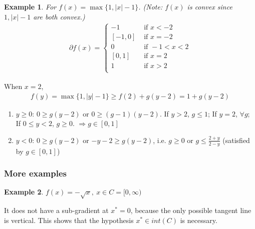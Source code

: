 \documentclass[11pt,a4paper]{article}
\newtheorem{example}{Example}
\begin{document}
\begin{example}
For $f(x)=\max\{1,|x|-1\}$. (Note: $f(x)$ is convex since $1,|x|-1$ are both convex.)
\begin{equation}
    \begin{aligned}
        \partial f(x)=\left\{\begin{matrix}
            -1&\text{ if }x<-2\\
            [-1,0]&\text{ if }x=-2\\
            0&\text{ if }-1<x<2\\
            [0,1]&\text{ if }x=2\\
            1&\text{ if }x>2\\
        \end{matrix}\right.
    \end{aligned}
    \nonumber
\end{equation}
\end{example}
When $x=2$,
\begin{equation}
    \begin{aligned}
        f(y)=\max\{1,|y|-1\}\geq f(2)+g(y-2)=1+g(y-2)
    \end{aligned}
    \nonumber
\end{equation}
\begin{enumerate}[(1)]
    \item \underline{$y\geq 0$}: $0\geq g(y-2)$ or $0\geq (g-1)(y-2)$. If $y>2$, $g\leq 1$; If $y=2$, $\forall g$; If $0\leq y< 2$, $g\geq 0$. $\Rightarrow g\in[0,1]$
    \item \underline{$y< 0$}: $0\geq g(y-2)$ or $-y-2\geq g(y-2)$, i.e. $g\geq 0$ or $g\leq \frac{2+y}{2-y}$ (satisfied by $g\in[0,1]$)
\end{enumerate}

\subsubsection{More examples}
\begin{example}
    $f(x)=-\sqrt{x},\ x\in C=[0,\infty)$
\end{example}
It does not have a sub-gradient at $x^* = 0$, because the only possible tangent line is vertical. This shows that the hypothesis $x^*\in int(C)$ is necessary.
\end{document}
